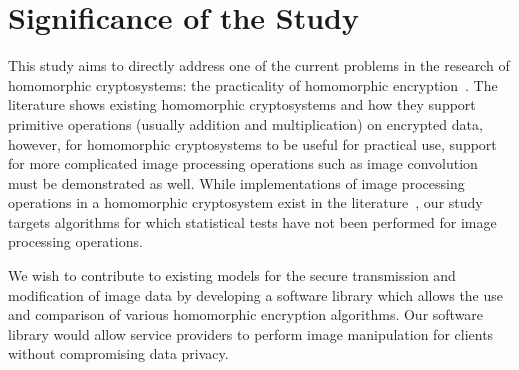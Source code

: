 \section{Significance of the Study}

This study aims to directly address one of the current problems in the research of homomorphic cryptosystems: the practicality of homomorphic encryption~\cite{sen_homomorphic_2013}. The literature shows existing homomorphic cryptosystems and how they support primitive operations (usually addition and multiplication) on encrypted data, however, for homomorphic cryptosystems to be useful for practical use, support for more complicated image processing operations such as image convolution must be demonstrated as well. While implementations of image processing operations in a homomorphic cryptosystem exist in the literature~\cite{ziad_cryptoimg:_2016, garay_algorithms_2014}, our study targets algorithms for which statistical tests have not been performed for image processing operations.

We wish to contribute to existing models for the secure transmission and modification of image data by developing a software library which allows the use and comparison of various homomorphic encryption algorithms. Our software library would allow service providers to perform image manipulation for clients without compromising data privacy.
